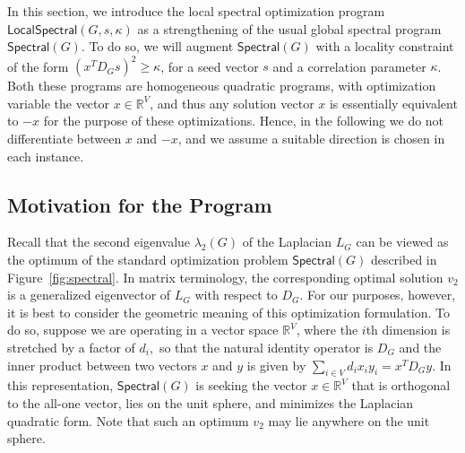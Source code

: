 \documentclass[11pt]{article}
\begin{document}
In this section, we introduce the local spectral optimization program 
$\textsf{LocalSpectral}(G, s, \kappa)$ as a strengthening of the usual
global spectral program $\mathsf{Spectral}(G)$.
To do so, we will augment $\mathsf{Spectral}(G)$ with a locality constraint
of the form $(x^TD_Gs)^2\geq\kappa$, for a seed vector $s$ and a correlation
parameter $\kappa$.
Both these programs are homogeneous quadratic programs, with optimization 
variable the vector $x \in \mathbb{R}^V$, and thus any solution vector $x$ 
is essentially equivalent to $-x$ for the purpose of these optimizations. 
Hence, in the following we do not differentiate between $x$ and $-x$, and we 
assume a suitable direction is chosen in each instance.


\subsection{Motivation for the Program}
\label{sxn:optimize-program}

Recall that the second eigenvalue $\lambda_2(G)$ of the Laplacian $L_G$ can 
be viewed as the optimum of the standard optimization problem 
$\mathsf{Spectral}(G)$ described in Figure~\ref{fig:spectral}. 
In matrix terminology, the corresponding optimal solution $v_2$ is a 
generalized eigenvector of $L_G$ with respect to $D_G$. 
For our purposes, however, it is best to consider the geometric meaning of 
this optimization formulation. 
To do so, suppose we are operating in a vector space $ \mathbb{R}^V$, where 
the $i$th dimension is stretched by a factor of $d_i,$ so that the natural 
identity operator is $D_G$ and the inner product between two vectors $x$ and 
$y$ is given by $\sum_{i \in V} d_i x_i y_i = x^T D_{G} y$.
In this representation, $\mathsf{Spectral}(G)$ is seeking the vector 
$x \in  \mathbb{R}^V$ that is orthogonal to the all-one vector, lies on the 
unit sphere, and minimizes the Laplacian quadratic form. 
Note that such an optimum $v_2$ may lie anywhere on the unit sphere.  
\end{document}
